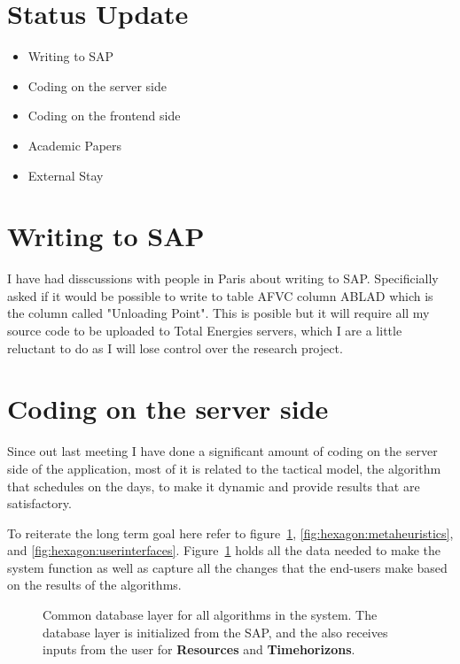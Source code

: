 \section{Status Update}

\begin{itemize}
	\item Writing to SAP
	\item Coding on the server side
	\item Coding on the frontend side
	\item Academic Papers
	\item External Stay
\end{itemize}

\section{Writing to SAP}
I have had disscussions with people in Paris about writing to SAP. Specificially 
asked if it would be possible to write to table AFVC column ABLAD which is the 
column called "Unloading Point". This is posible but it will require all
my source code to be uploaded to Total Energies servers, which I are a little 
reluctant to do as I will lose control over the research project.

\section{Coding on the server side}
Since out last meeting I have done a significant amount of coding on the server side
of the application, most of it is related to the tactical model, the algorithm that schedules
on the days, to make it dynamic and provide results that are satisfactory.

To reiterate the long term goal here refer to figure~\ref{fig:hexagon:persistence}, \ref{fig:hexagon:metaheuristics}, and \ref{fig:hexagon:userinterfaces}.
Figure~\ref{fig:hexagon:persistence} holds all the data
needed to make the system function as well as capture all the changes that the end-users make based on the results of the algorithms.


\begin{figure}[H]
	\centering
    \drawModelSetupHexagon[userinterface=false, persistence=true, metaheuristics=false]
	\caption{Common database layer for all algorithms in the system. The database layer is initialized from
	the SAP, and the also receives inputs from the user for \textbf{Resources} and \textbf{Timehorizons}.}
	\label{fig:hexagon:persistence}
\end{figure}

